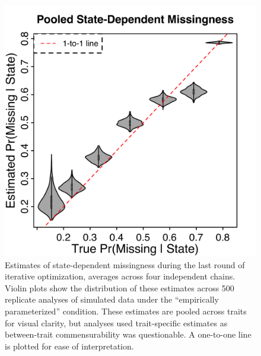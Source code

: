 \begin{figure}[h]
\centering
\includegraphics[width=160mm]{figures/chpt4_figure7.pdf}
\caption[Violin Plots of Estimated State-Dependent Missing Probabilities]{Estimates of state-dependent missingness during the last round of iterative optimization, averages across four independent chains. Violin plots show the distribution of these estimates across 500 replicate analyses of simulated data under the ``empirically parameterized'' condition. These estimates are pooled across traits for visual clarity, but analyses used trait-specific estimates as between-trait commensurability was questionable. A one-to-one line is plotted for ease of interpretation. \label{overflow}
\label{fig:simsMissingProbs}
}
\end{figure}


